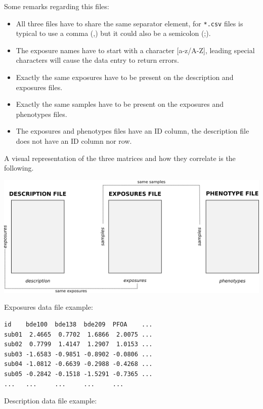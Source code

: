 \documentclass[
]{book}
\providecommand{\tightlist}{%
  \setlength{\itemsep}{0pt}\setlength{\parskip}{0pt}}
\begin{document}
Some remarks regarding this files:

\begin{itemize}
\tightlist
\item
  All three files have to share the same separator element, for \texttt{*.csv} files is typical to use a comma (,) but it could also be a semicolon (;).
\item
  The exposure names have to start with a character {[}a-z/A-Z{]}, leading special characters will cause the data entry to return errors.
\item
  Exactly the same exposures have to be present on the description and exposures files.
\item
  Exactly the same samples have to be present on the exposures and phenotypes files.
\item
  The exposures and phenotypes files have an ID column, the description file does not have an ID column nor row.
\end{itemize}

A visual representation of the three matrices and how they correlate is the following.

\includegraphics{images/exposome_dataset_struct.png}

Exposures data file example:

\begin{verbatim}
id    bde100  bde138  bde209  PFOA    ...
sub01  2.4665  0.7702  1.6866  2.0075 ...
sub02  0.7799  1.4147  1.2907  1.0153 ...  
sub03 -1.6583 -0.9851 -0.8902 -0.0806 ... 
sub04 -1.0812 -0.6639 -0.2988 -0.4268 ... 
sub05 -0.2842 -0.1518 -1.5291 -0.7365 ... 
...   ...     ...     ...     ...
\end{verbatim}

Description data file example:
\end{document}
